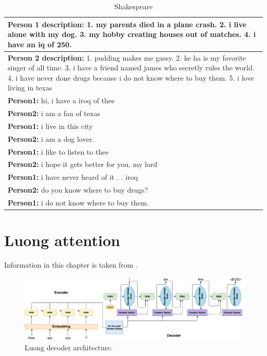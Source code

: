 \begin{table}[ht]
\centering
 \begin{tabular}{|p{14cm}|} 
 \hline\hline
 \textbf{Person 1 description:} 1. my parents died in a plane crash. 2. i live alone with my dog. 3. my hobby creating houses out of matches. 4. i have an iq of 250. \\
 \hline
 \textbf{Person 2 description:} 1. pudding makes me gassy. 2. ke ha is my favorite singer of all time. 3. i have a friend named james who secretly rules the world. 4. i have never done drugs because i do not know where to buy them. 5. i love living in texas \\
 \hline\hline
 \textbf{Person1:} hi, i have a iroq of thee  \\
 \textbf{Person2:} i am a fan of texas \\
 \textbf{Person1:} i live in this city \\ 
 \textbf{Person2:} i am a dog lover. \\
 \textbf{Person1:} i like to listen to thee\\
 \textbf{Person2:} i hope it gets better for you, my lord \\
 \textbf{Person1:} i have never heard of it . . iroq \\
 \textbf{Person2:} do you know where to buy drugs?\\
 \textbf{Person1:} i do not know where to buy them. \\
 \hline\hline
 \end{tabular}
 \caption{Shakespeare}
\label{tab:shake2}
\end{table}
\chapter{Luong attention} \label{luong_attn_appendix}

Information in this chapter is taken from \cite{luong2015effective}.
\begin{figure}[hbt]
  \centering
  \includegraphics[width=1\textwidth]{figures/luong_decoder.pdf}
  \caption{Luong decoder architecture.}
  \label{luong}
\end{figure}

